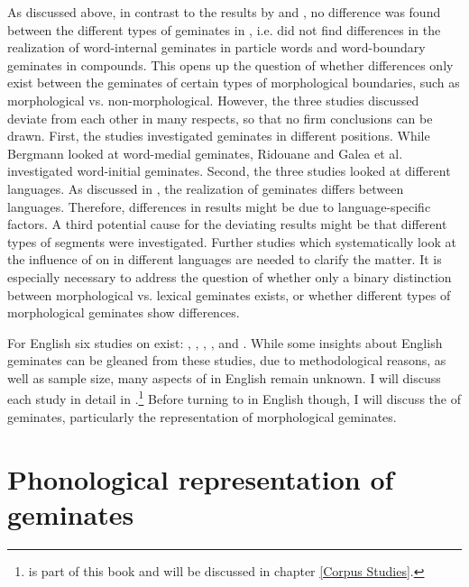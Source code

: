 As discussed above, in contrast to the results by \cite{Ridouane.2010} and \cite{Galea.2014}, no difference was found between the different types of geminates in \cite{Bergmann.2017}, i.e. \cite{Bergmann.2017} did not find differences in the realization of word-internal geminates in particle words and word-boundary geminates in compounds. This opens up the question of whether differences only exist between the geminates of certain types of morphological boundaries, such as morphological vs. non-morphological. However, the three studies discussed deviate from each other in many respects, so that no firm conclusions can be drawn. First, the studies investigated geminates in different positions. While Bergmann looked at word-medial geminates, Ridouane and Galea et al. investigated word-initial geminates. Second, the three studies looked at different languages. As discussed in , the realization of geminates differs between languages. Therefore, differences in results might be due to language-specific factors. A third potential cause for the deviating results might be that different types of segments were investigated. Further studies which systematically look at the influence of  on  in different languages are needed to clarify the matter. It is especially necessary to address the question of whether only a binary distinction between morphological vs.  lexical geminates exists, or whether different types of  morphological geminates show differences.


For English six studies on  exist: \cite{Delattre.}, \citet{Kaye.2005}, \citet{Oh.2012}, \cite{Oh.2013}, \cite{Kotzor.2016} and \cite{BenHedia.2017}. While some insights about English geminates can be gleaned from these studies, due to methodological reasons, as well as sample size, many aspects of  in English remain unknown. I will discuss each study in detail in .\footnote{\cite{BenHedia.2017} is part of this book and will be discussed in chapter \ref{Corpus Studies}.} Before turning to  in English though, I will discuss the  of geminates, particularly the representation of  morphological geminates.



\section{Phonological representation of geminates } \label{Phonological representation of geminates}

